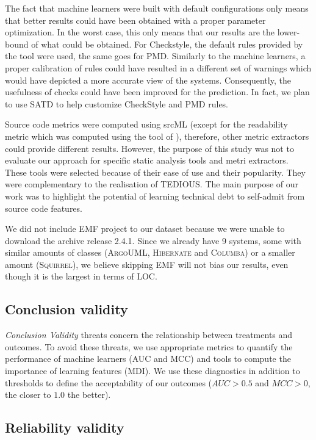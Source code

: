The fact that machine learners were built with default configurations only means that better results could have been obtained with a proper parameter optimization. In the worst case, this only means that our results are the lower-bound of what could be obtained. For Checkstyle, the default rules provided by the tool were used, the same goes for PMD. Similarly to the machine learners, a proper calibration of rules could have resulted in a different set of warnings which would have depicted a more accurate view of the systems. Consequently, the usefulness of checks could have been improved for the prediction. In fact, we plan to use SATD to help customize CheckStyle and PMD rules.

Source code metrics were computed using srcML \citep{Collard2013} (except for the readability metric which was computed using the tool of \citet{buse2008metric}), therefore, other metric extractors could provide different results. However, the purpose of this study was not to evaluate our approach for specific static analysis tools and metri extractors. These tools were selected because of their ease of use and their popularity. They were complementary to the realisation of TEDIOUS. The main purpose of our work was to highlight the potential of learning technical debt to self-admit from source code features.

We did not include \textsc{EMF} project to our dataset because we were unable to download the archive release 2.4.1. Since we already have 9 systems, some with similar amounts of classes (\textsc{ArgoUML}, \textsc{Hibernate} and \textsc{Columba}) or a smaller amount (\textsc{Squirrel}), we believe skipping \textsc{EMF} will not bias our results, even though it is the largest in terms of LOC.

\subsection{Conclusion validity}


\textit{Conclusion Validity} threats concern the relationship between treatments and outcomes. To avoid these threats, we use appropriate metrics to quantify the performance of machine learners (AUC and MCC) and tools to compute the importance of learning features (MDI). We use these diagnostics in addition to thresholds to define the acceptability of our outcomes ($AUC>0.5$ and $MCC>0$, the closer to $1.0$ the better).

\subsection{Reliability validity}

